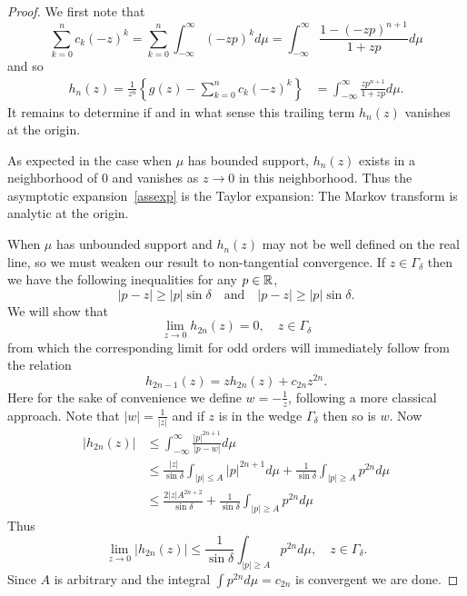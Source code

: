 \begin{proof}
  We first note that 
  \[
    \sum_{k=0}^{n} c_k {(-z)}^k 
    = \sum_{k=0}^{n} \int_{-\infty}^\infty {(-zp)}^k d\mu
    = \int_{-\infty}^\infty \frac{1 - {(-zp)}^{n+1}}{1 + zp} d\mu
  \]
  and so
  \begin{align*}
    h_n(z) = \frac1{z^n}\left\{g(z) - \sum_{k=0}^{n} c_k {(-z)}^k\right\}
    &= \int_{-\infty}^\infty \frac{zp^{n+1}}{1 + zp}d\mu.
  \end{align*}
  It remains to determine if and in what sense this trailing term $h_n(z)$ vanishes at the origin. 

  As expected in the case when $\mu$ has bounded support, $h_n(z)$ exists in a neighborhood of $0$ and vanishes as $z \rightarrow 0$ in this neighborhood. Thus the asymptotic expansion~\ref{assexp} is the Taylor expansion: The Markov transform is analytic at the origin.

  When $\mu$ has unbounded support and $h_n(z)$ may not be well defined on the real line, so we must weaken our result to non-tangential convergence. If $z \in \Gamma_\delta$ then we have the following inequalities for any $p \in \mathbb{R}$,
  \[
    |p - z| \geq |p| \sin \delta 
    \quad\text{and} \quad
    |p - z| \geq |p| \sin \delta.
  \]
  We will show that
  \[
    \lim_{z \rightarrow 0} h_{2n}(z) = 0, \quad z \in \Gamma_\delta
  \]
  from which the corresponding limit for odd orders will immediately follow from the relation
  \[
    h_{2n-1}(z)
    = zh_{2n}(z) + c_{2n}z^{2n}.
  \] 
  Here for the sake of convenience we define $w = -\frac1z$, following a more classical approach. Note that $|w| = \frac1{|z|}$ and if $z$ is in the wedge $\Gamma_\delta$ then so is $w$. Now 
  \begin{align*}
    |h_{2n}(z)| 
    &\leq \int_{-\infty}^\infty \frac{|p|^{2n+1}}{|p - w|}d\mu \\
    &\leq \frac{|z|}{\sin \delta} \int_{|p| \leq A} |p|^{2n+1} d\mu
    + \frac1{\sin \delta} \int_{|p| \geq A} p^{2n} d\mu \\
    &\leq \frac{2|z| A^{2n+2}}{\sin \delta}
    + \frac1{\sin \delta} \int_{|p| \geq A} p^{2n} d\mu
  \end{align*}
  Thus 
  \[
    \lim_{z \rightarrow 0} |h_{2n}(z)| \leq \frac1{\sin \delta} \int_{|p| \geq A} p^{2n} d\mu, \quad z \in \Gamma_\delta.
  \]
  Since $A$ is arbitrary and the integral $\int p^{2n} d\mu = c_{2n}$ is convergent we are done.
\end{proof}


